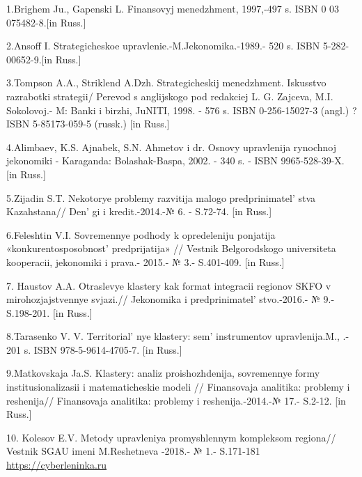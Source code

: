 \begin{references}

1.Brighem Ju., Gapenski L. Finansovyj menedzhment, 1997,-497 s. ISBN 0
03 075482-8.{[}in Russ.{]}

2.Ansoff I. Strategicheskoe upravlenie.-M.Jekonomika.-1989.- 520 s. ISBN
5-282-00652-9.{[}in Russ.{]}

3.Tompson A.A., Striklend A.Dzh. Strategicheskij menedzhment. Iskusstvo
razrabotki strategii/ Perevod s anglijskogo pod redakciej L. G. Zajceva,
M.I. Sokolovoj.- M: Banki i birzhi, JuNITI, 1998. - 576 s. ISBN
0-256-15027-3 (angl.) ?ISBN 5-85173-059-5 (russk.) {[}in Russ.{]}

4.Alimbaev, K.S. Ajnabek, S.N. Ahmetov i dr. Osnovy upravlenija
rynochnoj jekonomiki - Karaganda: Bolashak-Baspa, 2002. - 340 s. - ISBN
9965-528-39-X. {[}in Russ.{]}

5.Zijadin S.T. Nekotorye problemy razvitija malogo
predprinimatel' stva Kazahstana// Den' gi
i kredit.-2014.-№ 6. - S.72-74. {[}in Russ.{]}

6.Feleshtin V.I. Sovremennye podhody k opredeleniju ponjatija
«konkurentosposobnost'{} predprijatija» // Vestnik
Belgorodskogo universiteta kooperacii, jekonomiki i prava.- 2015.- № 3.-
S.401-409. {[}in Russ.{]}

7. Haustov A.A. Otraslevye klastery kak format integracii regionov SKFO
v mirohozjajstvennye svjazi.// Jekonomika i
predprinimatel' stvo.-2016.- № 9.- S.198-201. {[}in
Russ.{]}

8.Tarasenko V. V. Territorial' nye klastery:
sem'{} instrumentov upravlenija.M.,
.- 201 s. ISBN 978-5-9614-4705-7. {[}in Russ.{]}

9.Matkovskaja Ja.S. Klastery: analiz proishozhdenija, sovremennye formy
institusionalizasii i \linebreak matematicheskie modeli // Finansovaja analitika:
problemy i reshenija// Finansovaja analitika: problemy i
reshenija.-2014.-№ 17.- S.2-12. {[}in Russ.{]}

10. Kolesov E.V. Metody upravleniya promyshlennym kompleksom regiona//
Vestnik SGAU \linebreak imeni M.Reshetneva -2018.- № 1.- S.171-181 \href{https://cyberleninka.ru/article/n/metody-upravleniya-promyshlennym-kompleksom-regiona}{https://cyberleninka.ru}
\end{references}
